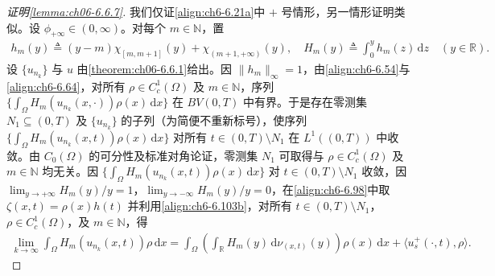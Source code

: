 \documentclass[../../main.tex]{subfiles}%
\begin{document}
\begin{proof}[证明\cref{lemma:ch06-6.6.7}]
我们仅证\eqref{align:ch6-6.21a}中 $+$ 号情形，另一情形证明类似。设 $\phi_{+\infty}\in(0,\infty)$。对每个 $m\in\mathbb{N}$，置
\begin{align*}
h_m(y)\triangleq (y-m)\chi_{[m,m+1]}(y)+\chi_{(m+1,+\infty)}(y),\quad
H_m(y)\triangleq \int_0^y h_m(z)\,\mathrm{d}z \quad(y\in\mathbb{R}).
\end{align*}
设 $\{u_{n_k}\}$ 与 $u$ 由\cref{theorem:ch06-6.6.1}给出。因 $\|h_m\|_\infty=1$，由\eqref{align:ch6-6.54}与\eqref{align:ch6-6.64}，对所有 $\rho\in C^1_c(\Omega)$ 及 $m\in\mathbb{N}$，序列 $\{\int_\Omega H_m(u_{n_k}(x,\cdot))\rho(x)\,\mathrm{d}x\}$ 在 $BV(0,T)$ 中有界。于是存在零测集 $N_1\subseteq(0,T)$ 及 $\{u_{n_k}\}$ 的子列（为简便不重新标号），使序列 $\{\int_\Omega H_m(u_{n_k}(x,t))\rho(x)\,\mathrm{d}x\}$ 对所有 $t\in(0,T)\setminus N_1$ 在 $L^1((0,T))$ 中收敛。由 $C_0(\Omega)$ 的可分性及标准对角论证，零测集 $N_1$ 可取得与 $\rho\in C^1_c(\Omega)$ 及 $m\in\mathbb{N}$ 均无关。因 $\{\int_\Omega H_m(u_{n_k}(x,t))\rho(x)\,\mathrm{d}x\}$ 对 $t\in(0,T)\setminus N_1$ 收敛，因 $\lim_{y\to+\infty}H_m(y)/y=1$，$\lim_{y\to-\infty}H_m(y)/y=0$，在\eqref{align:ch6-6.98}中取 $\zeta(x,t)=\rho(x)h(t)$ 并利用\eqref{align:ch6-6.103b}，对所有 $t\in(0,T)\setminus N_1$，$\rho\in C^1_c(\Omega)$，及 $m\in\mathbb{N}$，得
\begin{align}
\lim_{k\to\infty}\int_\Omega H_m(u_{n_k}(x,t))\rho\,\mathrm{d}x
=\int_\Omega\left(\int_\mathbb{R}H_m(y)\,\mathrm{d}\nu_{(x,t)}(y)\right)\rho(x)\,\mathrm{d}x
+\langle u^+_s(\cdot,t),\rho\rangle. \label{align:ch6-6.123}
\end{align}


\end{proof}
\end{document}
